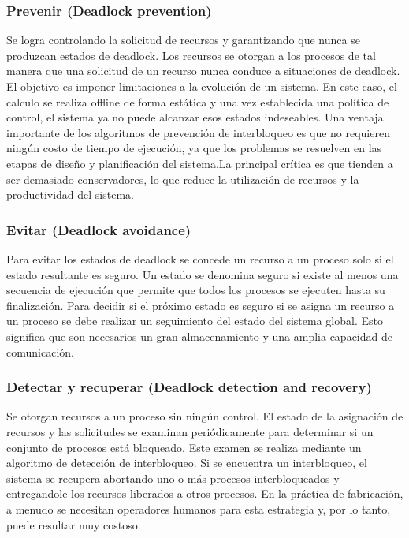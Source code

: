 \subsubsection{Prevenir (Deadlock prevention)}
Se logra controlando la solicitud de recursos y garantizando que nunca se produzcan estados de deadlock. Los recursos se otorgan a los procesos de tal manera que una solicitud de un recurso nunca conduce a situaciones de deadlock. El objetivo es imponer limitaciones a la evolución de un sistema. En este caso, el calculo se realiza offline de forma estática y una vez establecida una política de control, el sistema ya no puede alcanzar esos estados indeseables.
Una ventaja importante de los algoritmos de prevención de interbloqueo es que no requieren ningún costo de tiempo de ejecución, ya que los problemas se resuelven en las etapas de diseño y planificación del sistema.La principal crítica es que tienden a ser demasiado conservadores, lo que reduce la utilización de recursos y la productividad del sistema.

\subsubsection{Evitar (Deadlock avoidance)}
Para evitar los estados de deadlock se concede un recurso a un proceso solo si el estado resultante es seguro. Un estado se denomina seguro si existe al menos una secuencia de ejecución que permite que todos los procesos se ejecuten hasta su finalización. Para decidir si el próximo estado es seguro si se asigna un recurso a un proceso se debe realizar un seguimiento del estado del sistema global. Esto significa que son necesarios un gran almacenamiento y una amplia capacidad de comunicación.

\subsubsection{Detectar y recuperar (Deadlock detection and recovery)}
Se otorgan recursos a un proceso sin ningún control. El estado de la asignación de recursos y las solicitudes se examinan periódicamente para determinar si un conjunto de procesos está bloqueado. Este examen se realiza mediante un algoritmo de detección de interbloqueo. Si se encuentra un interbloqueo, el sistema se recupera abortando uno o más procesos interbloqueados y entregandole los recursos liberados a otros procesos. En la práctica de fabricación, a menudo se necesitan operadores humanos para esta estrategia y, por lo tanto, puede resultar muy costoso.

